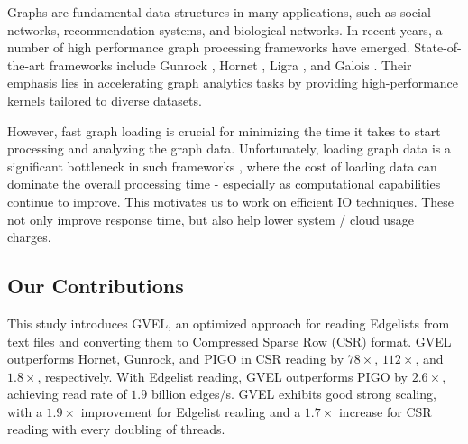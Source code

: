Graphs are fundamental data structures in many applications, such as social networks, recommendation systems, and biological networks. In recent years, a number of high performance graph processing frameworks have emerged. State-of-the-art frameworks include Gunrock \cite{wang2016gunrock}, Hornet \cite{busato2018hornet}, Ligra \cite{shun2013ligra}, and Galois \cite{nguyen2013lightweight}. Their emphasis lies in accelerating graph analytics tasks by providing high-performance kernels tailored to diverse datasets.

However, fast graph loading is crucial for minimizing the time it takes to start processing and analyzing the graph data. Unfortunately, loading graph data is a significant bottleneck in such frameworks \cite{gabert2021pigo}, where the cost of loading data can dominate the overall processing time - especially as computational capabilities continue to improve. This motivates us to work on efficient IO techniques. These not only improve response time, but also help lower system / cloud usage charges.




\subsection{Our Contributions}

This study introduces GVEL, an optimized approach for reading Edgelists from text files and converting them to Compressed Sparse Row (CSR) format. GVEL outperforms Hornet, Gunrock, and PIGO in CSR reading by $78\times$, $112\times$, and $1.8\times$, respectively. With Edgelist reading, GVEL outperforms PIGO by $2.6\times$, achieving read rate of $1.9$ billion edges/s. GVEL exhibits good strong scaling, with a $1.9\times$ improvement for Edgelist reading and a $1.7\times$ increase for CSR reading with every doubling of threads.




